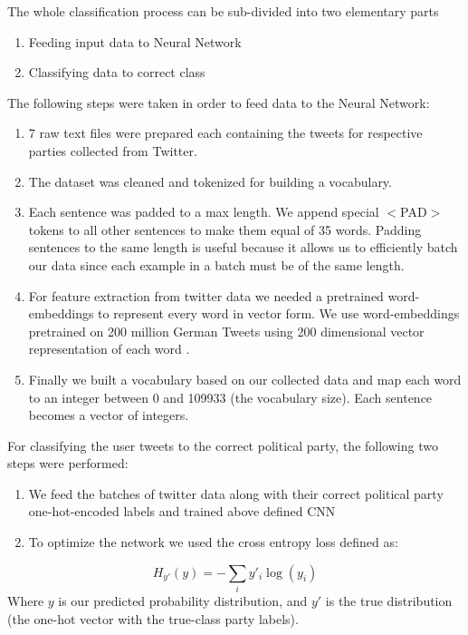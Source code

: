 \documentclass[10pt, oneside]{article}
\begin{document}
\begin{multicols}{2}
The whole classification process can be sub-divided into two elementary parts
\begin{enumerate}
\item Feeding input data to Neural Network
\item Classifying data to correct class
\end{enumerate}
The following steps were taken in order to feed data to the Neural Network:
\begin{enumerate}
\item 7 raw text files were prepared each containing the tweets for respective parties collected from Twitter.
\item The dataset was cleaned and tokenized for building a vocabulary.
\item Each sentence was padded to a max length. We append special $<$PAD$>$ tokens to all other sentences to make them equal of 35 words. Padding sentences to the same length is useful because it allows us to efficiently batch our data since each example in a batch must be of the same length.
\item For feature extraction from twitter data we needed a pretrained word-embeddings to represent every word in vector form. We use word-embeddings \cite{DBLP:journals/corr/abs-1301-3781} pretrained on 200 million German Tweets using 200 dimensional vector representation of each word \cite{cieliebak2017twitter}.  
\item Finally we built a vocabulary based on our collected data and map each word to an integer between 0 and 109933 (the vocabulary size). Each sentence becomes a vector of integers.
\end{enumerate}

For classifying the user tweets to the correct political party, the following two steps were performed:
\begin{enumerate}
	\item We feed the batches of twitter data along with their correct political party one-hot-encoded labels and trained above defined CNN 
	\item To optimize the network we used the cross entropy loss defined as:
\end{enumerate}
\begin{equation}
	H_{y'}(y) = - \sum_{i} y'_{i} \log (y_{i})
\end{equation}
Where $y$ is our predicted probability distribution, and $y'$ is the true distribution (the one-hot vector with the true-class party labels). 



\end{multicols}
\end{document}

